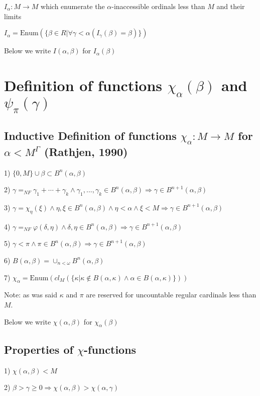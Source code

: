 \documentclass[10pt]{article}
\begin{document}
 \(I_\alpha:M\rightarrow M\) which enumerate the \(\alpha\)-inaccessible ordinals less than \(M\) and their limits

\(I_\alpha=\text{Enum}(\{\beta\in R|\forall\gamma<\alpha(I_\gamma(\beta)=\beta)\}) \)

Below we write \(I(\alpha,\beta)\) for \(I_\alpha(\beta)\)


\section{Definition of functions \(\chi_\alpha(\beta) \) and \(\psi_\pi(\gamma) \)}

\subsection{Inductive Definition of  functions \(\chi_\alpha: M\rightarrow M\) for \(\alpha <M^{\Gamma}\) (Rathjen, 1990)}

1) \(\{0,M\}\cup\beta\subset B^n(\alpha, \beta)\)

2) \(\gamma=_{NF}\gamma_1+\cdots+\gamma_k\wedge\gamma_1,...,\gamma_k\in B^n(\alpha, \beta)\Rightarrow\gamma\in B^{n+1}(\alpha, \beta)\)

3) \(\gamma=\chi_\eta(\xi)\wedge\eta,\xi\in B^n(\alpha, \beta)\wedge\eta<\alpha\wedge\xi<M\Rightarrow\gamma\in B^{n+1}(\alpha, \beta)\)

4) \(\gamma=_{NF}\varphi(\delta,\eta) \wedge\delta,\eta\in B^n(\alpha, \beta)\Rightarrow\gamma\in B^{n+1}(\alpha, \beta)\)

5) \(\gamma<\pi\wedge\pi\in B^n(\alpha, \beta)\Rightarrow\gamma\in B^{n+1}(\alpha, \beta)\)

6) \(B(\alpha,\beta)=\cup_{n<\omega}B^{n}(\alpha, \beta)\)

7) \(\chi_\alpha=\text{Enum}(cl_M(\{\kappa|\kappa\notin B(\alpha,\kappa)\wedge\alpha\in B(\alpha,\kappa)\}))\)

Note: as was said \(\kappa\) and \(\pi \) are reserved for uncountable regular cardinals less than \(M\). 

Below we write \(\chi(\alpha,\beta)\) for \(\chi_\alpha(\beta)\)

\subsection{Properties of  \(\chi\)-functions}

1) \(\chi(\alpha,\beta)<M\)

2) \(\beta>\gamma\geq 0 \Rightarrow \chi(\alpha,\beta)>\chi(\alpha,\gamma)\) 
\end{document}
